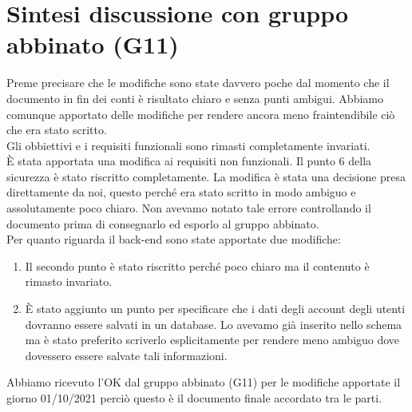 \documentclass{article}
\begin{document}
\section{Sintesi discussione con gruppo abbinato (G11)}
Preme precisare che le modifiche sono state davvero poche dal momento che il documento in fin dei conti è risultato chiaro e senza punti ambigui. Abbiamo comunque
apportato delle modifiche per rendere ancora meno fraintendibile ciò che era stato scritto.\\
Gli obbiettivi e i requisiti funzionali sono rimasti completamente invariati.\\
È stata apportata una modifica ai requisiti non funzionali. Il punto 6 della sicurezza è stato riscritto completamente. La modifica è stata una decisione presa
direttamente da noi, questo perché era stato scritto in modo ambiguo e assolutamente poco chiaro. Non avevamo notato tale errore controllando il documento prima di
consegnarlo ed esporlo al gruppo abbinato.\\
Per quanto riguarda il back-end sono state apportate due modifiche:
\begin{enumerate}
        \item Il secondo punto è stato riscritto perché poco chiaro ma il contenuto è rimasto invariato.
        \item È stato aggiunto un punto per specificare che i dati degli account degli utenti dovranno essere salvati in un database. Lo avevamo già inserito nello
                schema ma è stato preferito scriverlo esplicitamente per rendere meno ambiguo dove dovessero essere salvate tali informazioni.
\end{enumerate}
Abbiamo ricevuto l'OK dal gruppo abbinato (G11) per le modifiche apportate il giorno 01/10/2021 perciò questo è il documento finale accordato tra le parti.
\end{document}

